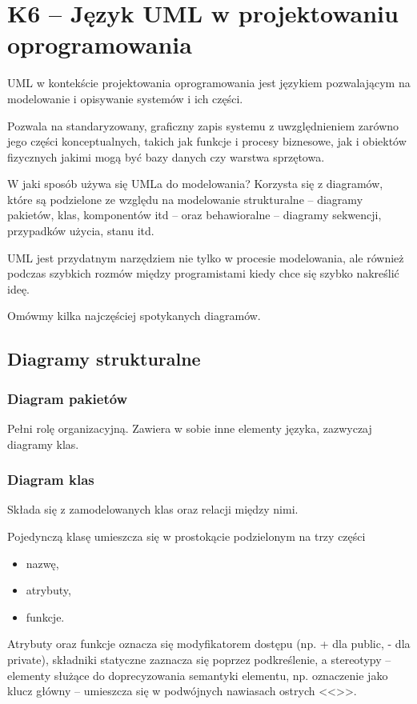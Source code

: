 \section{K6 -- Język UML w projektowaniu oprogramowania}

UML w kontekście projektowania oprogramowania jest językiem pozwalającym na modelowanie i opisywanie systemów i ich części.

Pozwala na standaryzowany, graficzny zapis systemu z uwzględnieniem zarówno jego części konceptualnych, takich jak funkcje i procesy biznesowe, jak i obiektów fizycznych jakimi mogą być bazy danych czy warstwa sprzętowa.

W jaki sposób używa się UMLa do modelowania? Korzysta się z diagramów, które są podzielone ze względu na modelowanie strukturalne -- diagramy pakietów, klas, komponentów itd -- oraz behawioralne -- diagramy sekwencji, przypadków użycia, stanu itd.

UML jest przydatnym narzędziem nie tylko w procesie modelowania, ale również podczas szybkich rozmów między programistami kiedy chce się szybko nakreślić ideę.

Omówmy kilka najczęściej spotykanych diagramów.

\subsection{Diagramy strukturalne}
\subsubsection{Diagram pakietów}
Pełni rolę organizacyjną. Zawiera w sobie inne elementy języka, zazwyczaj diagramy klas.

\subsubsection{Diagram klas}
Składa się z zamodelowanych klas oraz relacji między nimi.

Pojedynczą klasę umieszcza się w prostokącie podzielonym na trzy części
\begin{itemize}
	\item{nazwę,}
	\item{atrybuty,}
	\item{funkcje.}
\end{itemize}

Atrybuty oraz funkcje oznacza się modyfikatorem dostępu (np. + dla public, - dla private), składniki statyczne zaznacza się poprzez podkreślenie, a stereotypy -- elementy służące do doprecyzowania semantyki elementu, np. oznaczenie jako klucz główny -- umieszcza się w podwójnych nawiasach ostrych <<>>.

